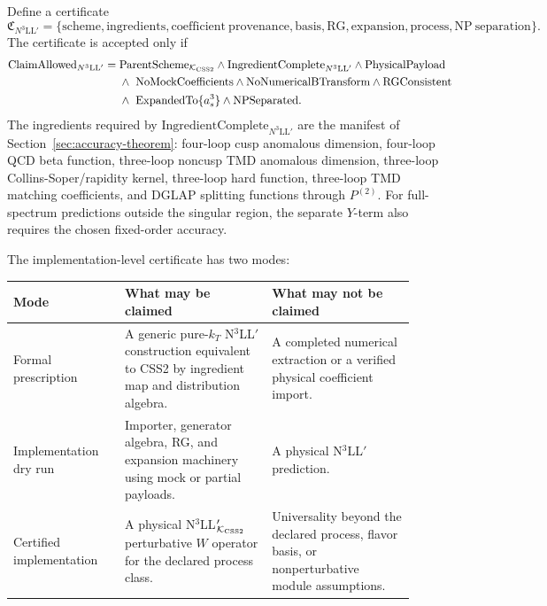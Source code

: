 \documentclass[11pt]{article}
\newcommand{\KCSS}{\mathcal K_{\rm CSS2}}
\begin{document}
Define a certificate
\begin{equation}
  \mathfrak C_{N^3\mathrm{LL}'}
  =
  \{\mathrm{scheme},\mathrm{ingredients},\mathrm{coefficient\ provenance},
  \mathrm{basis},\mathrm{RG},\mathrm{expansion},\mathrm{process},\mathrm{NP\ separation}\} .
  \label{eq:n3llprime-certificate-set-v16}
\end{equation}
The certificate is accepted only if
\begin{equation}
\begin{aligned}
  \mathrm{ClaimAllowed}_{N^3\mathrm{LL}'}={}&
  \mathrm{ParentScheme}_{\KCSS}
  \wedge \mathrm{IngredientComplete}_{N^3\mathrm{LL}'}
  \wedge \mathrm{PhysicalPayload}
  \\
  &\wedge\ \mathrm{NoMockCoefficients}
  \wedge \mathrm{NoNumericalBTransform}
  \wedge \mathrm{RGConsistent}
  \\
  &\wedge\ \mathrm{ExpandedTo}\{a_s^3\}
  \wedge \mathrm{NPSeparated} .
\end{aligned}
\label{eq:claim-allowed-n3llprime-v16}
\end{equation}
The ingredients required by \(\mathrm{IngredientComplete}_{N^3\mathrm{LL}'}\) are the
manifest of Section~\ref{sec:accuracy-theorem}: four-loop cusp anomalous dimension,
four-loop QCD beta function, three-loop noncusp TMD anomalous dimension, three-loop
Collins-Soper/rapidity kernel, three-loop hard function, three-loop TMD matching
coefficients, and DGLAP splitting functions through \(P^{(2)}\).  For full-spectrum
predictions outside the singular region, the separate $Y$-term also requires the chosen
fixed-order accuracy.

The implementation-level certificate has two modes:
\begin{center}\small
\begin{tabular}{>{\raggedright\arraybackslash}p{0.25\linewidth}
                >{\raggedright\arraybackslash}p{0.33\linewidth}
                >{\raggedright\arraybackslash}p{0.32\linewidth}}
\toprule
Mode & What may be claimed & What may not be claimed \\
\midrule
Formal prescription & A generic pure-$k_T$ N$^3$LL$'$ construction equivalent to CSS2 by ingredient map and distribution algebra. & A completed numerical extraction or a verified physical coefficient import. \\
Implementation dry run & Importer, generator algebra, RG, and expansion machinery using mock or partial payloads. & A physical N$^3$LL$'$ prediction. \\
Certified implementation & A physical N$^3$LL$'_{\KCSS}$ perturbative $W$ operator for the declared process class. & Universality beyond the declared process, flavor basis, or nonperturbative module assumptions. \\
\bottomrule
\end{tabular}
\end{center}
\end{document}
